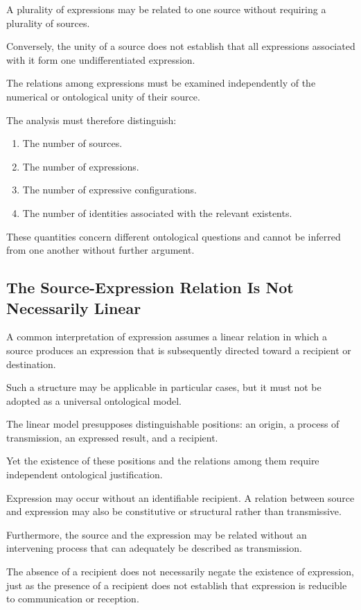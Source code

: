 A plurality of expressions may be related
to one source without requiring a plurality
of sources.

Conversely, the unity of a source does not
establish that all expressions associated
with it form one undifferentiated expression.

The relations among expressions must be
examined independently of the numerical
or ontological unity of their source.

The analysis must therefore distinguish:

\begin{enumerate}
    \item The number of sources.
    \item The number of expressions.
    \item The number of expressive configurations.
    \item The number of identities associated
    with the relevant existents.
\end{enumerate}

These quantities concern different ontological
questions and cannot be inferred from one another
without further argument.

\subsection{The Source-Expression Relation Is Not Necessarily Linear}

A common interpretation of expression assumes
a linear relation in which a source produces
an expression that is subsequently directed
toward a recipient or destination.

Such a structure may be applicable in particular
cases, but it must not be adopted as a universal
ontological model.

The linear model presupposes distinguishable
positions: an origin, a process of transmission,
an expressed result, and a recipient.

Yet the existence of these positions and the
relations among them require independent
ontological justification.

Expression may occur without an identifiable
recipient. A relation between source and expression
may also be constitutive or structural rather
than transmissive.

Furthermore, the source and the expression
may be related without an intervening process
that can adequately be described as transmission.

The absence of a recipient does not necessarily
negate the existence of expression, just as
the presence of a recipient does not establish
that expression is reducible to communication
or reception.

